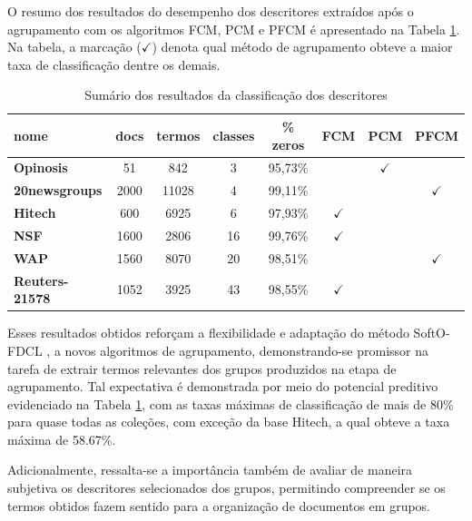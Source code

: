 O resumo dos resultados do desempenho dos descritores extraídos após o agrupamento com os
algoritmos FCM, PCM e PFCM é apresentado na Tabela \ref{table:pfcmsummary}. Na tabela, a marcação
($\checkmark$) denota qual método de agrupamento obteve a maior taxa de classificação dentre os
demais.

\begin{table}[!htp]
  \centering
  \begin{tabular}{ |l|c c c c c c c|}
    \hline
    {\bf nome} & docs & termos & classes & \% zeros & FCM & PCM & PFCM \\
    \hline
    {\bf Opinosis} & 51 & 842 & 3 & 95,73\% & & $\checkmark$ &  \\
    \hline
    {\bf 20newsgroups} & 2000 & 11028 & 4 & 99,11\% & & & $\checkmark$\\
    \hline
    {\bf Hitech} & 600 & 6925 & 6 & 97,93\% & $\checkmark$ & & \\
    \hline
    {\bf NSF} & 1600 & 2806 & 16 & 99,76\% & $\checkmark$ & & \\
    \hline
    {\bf WAP} & 1560 & 8070 & 20 & 98,51\% & & & $\checkmark$ \\
    \hline
    {\bf Reuters-21578} & 1052 & 3925 & 43 & 98,55\% & $\checkmark$ & & \\
    \hline
  \end{tabular}
  \caption{Sumário dos resultados da classificação dos descritores}
  \label{table:pfcmsummary}
\end{table}

Esses resultados obtidos reforçam a flexibilidade e adaptação do método SoftO-FDCL
\cite{Nogueira2013}, a novos algoritmos de agrupamento, demonstrando-se promissor na tarefa de
extrair termos relevantes dos grupos produzidos na etapa de agrupamento. Tal expectativa é
demonstrada por meio do potencial preditivo evidenciado na Tabela \ref{table:pfcmsummary}, com as
taxas máximas de classificação de mais de 80\% para quase todas as coleções, com exceção da base
Hitech, a qual obteve a taxa máxima de 58.67\%.  

Adicionalmente, ressalta-se a importância também de avaliar de maneira subjetiva os descritores
selecionados dos grupos, permitindo  compreender se os termos obtidos fazem sentido para a
organização de documentos em grupos. 

